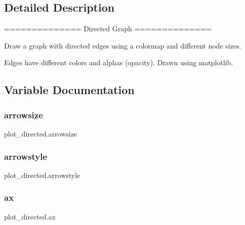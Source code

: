 \subsection{Detailed Description}
\begin{DoxyVerb}==============
Directed Graph
==============

Draw a graph with directed edges using a colormap and different node sizes.

Edges have different colors and alphas (opacity). Drawn using matplotlib.
\end{DoxyVerb}
 

\subsection{Variable Documentation}
\mbox{\label{namespaceplot__directed_a3bbb0e67cdb48ec2f6d57c0fb749eac2}} 
\subsubsection{\texorpdfstring{arrowsize}{arrowsize}}
{\footnotesize\ttfamily plot\+\_\+directed.\+arrowsize}

\mbox{\label{namespaceplot__directed_ad9cae60cbc7723168863c1030f3884ef}} 
\subsubsection{\texorpdfstring{arrowstyle}{arrowstyle}}
{\footnotesize\ttfamily plot\+\_\+directed.\+arrowstyle}

\mbox{\label{namespaceplot__directed_a602991187a35820a4270b5f81d3b22ae}} 
\subsubsection{\texorpdfstring{ax}{ax}}
{\footnotesize\ttfamily plot\+\_\+directed.\+ax}

\mbox{\label{namespaceplot__directed_a33d775365f05135e5d50ed14c1beae3c}} 
